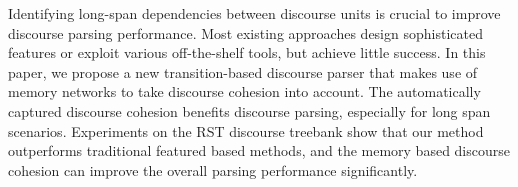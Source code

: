 Identifying long-span dependencies between discourse units is crucial to improve discourse parsing performance. Most existing approaches design sophisticated features or exploit various off-the-shelf tools, but achieve little success. In this paper, we propose a new transition-based discourse parser that makes use of memory networks to take discourse cohesion into account.  The automatically captured discourse cohesion benefits discourse parsing, especially for long span scenarios. Experiments on the RST discourse treebank show that our method outperforms traditional featured based methods, and the memory based discourse cohesion can improve the overall parsing performance significantly.
